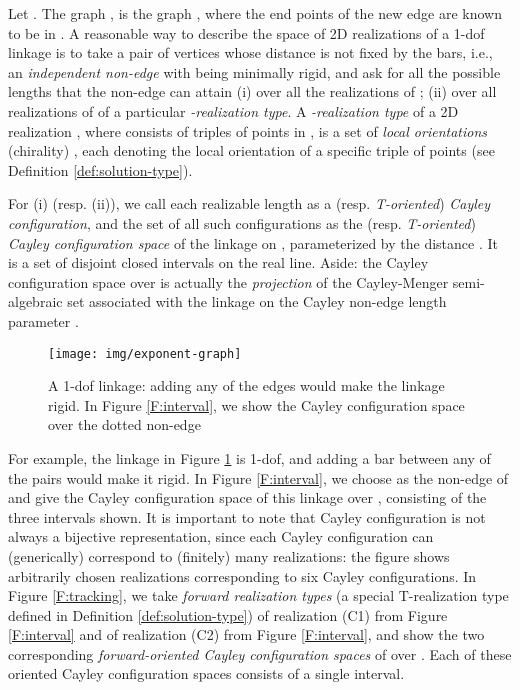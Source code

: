\documentclass[secthm,amsthm,english]{article}
\theoremstyle{definition}
\theoremstyle{remark}
\begin{document}
Let . The graph , is the graph , 
where the end
points of the new edge  are known to be in .
A reasonable way to describe the space of 2D realizations of a 1-dof
linkage  is to take a pair of vertices whose distance is not fixed by the bars,
i.e., an {\em independent non-edge}  with  being minimally rigid, 
and ask for all the possible lengths  that the non-edge  can attain (i) over all the realizations of ; 
(ii) over all realizations of  of a particular \emph{-realization type}. A \emph{-realization type} of a 2D realization ,
where  consists of triples of points in , 
is a set   of \emph{local orientations} (chirality) , each denoting the local orientation of a specific 
triple of points  (see Definition \ref{def:solution-type}). 


For (i) (resp. (ii)), we call each realizable length  as a (resp. \emph{T-oriented}) \emph{Cayley configuration}, 
and the set of all such configurations as the (resp. \emph{T-oriented}) \emph{Cayley configuration space} of the linkage  on , parameterized by the distance . 
It is a set of disjoint closed intervals on the real line.
Aside: the Cayley configuration space over  
is actually the \textsl{projection} of the Cayley-Menger semi-algebraic set \cite{bib:cayley}
associated with the linkage  on the Cayley non-edge length parameter . 


\begin{figure}[h]
	
	\begin{centering}
	\texttt{[image: img/exponent-graph]}
	\par\end{centering}
	
	\caption{A 1-dof linkage: adding any of the edges  would make the linkage rigid. 
	In Figure \ref{F:interval}, we show the Cayley configuration space over the dotted non-edge }

\label{F:intro} 
\end{figure}

For example, the linkage  in Figure \ref{F:intro} is 1-dof, 
and adding a bar between any of the pairs  would make it rigid.
In Figure \ref{F:interval},  
we choose  as the non-edge  of  and
give the Cayley configuration space of this linkage over ,
consisting of the three intervals shown. 
It is important to note that Cayley configuration is not always a bijective representation, 
since each Cayley configuration can (generically) correspond to (finitely) many realizations: 
the figure shows arbitrarily chosen realizations corresponding to six Cayley configurations.
In Figure \ref{F:tracking}, 
we take \emph{forward realization types} (a special T-realization type defined in Definition \ref{def:solution-type})
 of realization (C1) from Figure \ref{F:interval} and  of realization (C2) from Figure \ref{F:interval}, 
and show the two corresponding \emph{forward-oriented Cayley configuration spaces} of 
over .  
Each of these oriented Cayley configuration spaces consists of a single interval. 
\end{document}
